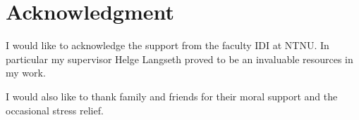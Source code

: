 
\chapter*{Acknowledgment}
I would like to acknowledge the support from the faculty IDI at NTNU. In particular my supervisor Helge Langseth proved to be an invaluable resources in my work.

I would also like to thank family and friends for their moral support and the occasional stress relief. 